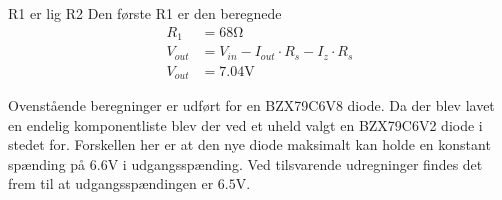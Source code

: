 R1 er lig R2
Den første R1 er den beregnede
\begin{align}
	R_1 & = 68 \si{\ohm} \nonumber \\
	V_{out} & = V_{in} - I_{out} \cdot R_s - I_z \cdot R_s \\
	V_{out} & = 7.04 \si{\volt} \label{eq:RegulatorBeregnetPotentiale} 
\end{align}

Ovenstående beregninger er udført for en BZX79C6V8 diode. 
Da der blev lavet en endelig komponentliste blev der ved et uheld valgt en BZX79C6V2 diode i stedet for. 
Forskellen her er at den nye diode maksimalt kan holde en konstant spænding på $6.6 \si{\volt}$ i udgangsspænding.
Ved tilsvarende udregninger findes det frem til at udgangsspændingen er $6.5 \si{\volt}$.